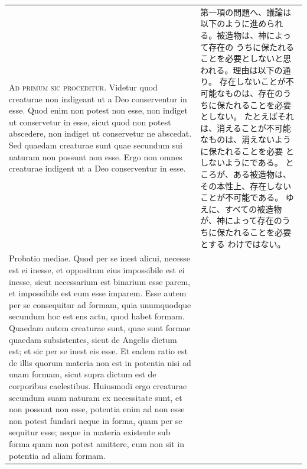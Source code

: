 \documentclass[paper=a4paper,fontsize=10pt,jafontsize=9pt,titlepage]{jlreq}
\begin{document}
\begin{longtable}{p{21em}p{21em}}


{\huge A}{\scshape d primum sic proceditur}. Videtur quod
creaturae non indigeant ut a Deo conserventur in esse. Quod enim non
potest non esse, non indiget ut conservetur in esse, sicut quod non
potest abscedere, non indiget ut conservetur ne abscedat. Sed quaedam
creaturae sunt quae secundum sui naturam non possunt non esse. Ergo non
omnes creaturae indigent ut a Deo conserventur in esse. 


&

第一項の問題へ、議論は以下のように進められる。被造物は、神によって存在の
 うちに保たれることを必要としないと思われる。理由は以下の通り。
存在しないことが不可能なものは、存在のうちに保たれることを必要としない。
 たとえばそれは、消えることが不可能なものは、消えないように保たれることを必要
 としないようにである。
ところが、ある被造物は、その本性上、存在しないことが不可能である。
ゆえに、すべての被造物が、神によって存在のうちに保たれることを必要とする
 わけではない。


\\



Probatio
mediae. Quod per se inest alicui, necesse est ei inesse, et oppositum
eius impossibile est ei inesse, sicut necessarium est binarium esse
parem, et impossibile est eum esse imparem. Esse autem per se
consequitur ad formam, quia unumquodque secundum hoc est ens actu, quod
habet formam. Quaedam autem creaturae sunt, quae sunt formae quaedam
subsistentes, sicut de Angelis dictum est; et sic per se inest eis
esse. Et eadem ratio est de illis quorum materia non est in potentia
nisi ad unam formam, sicut supra dictum est de corporibus
caelestibus. Huiusmodi ergo creaturae secundum suam naturam ex
necessitate sunt, et non possunt non esse, potentia enim ad non esse non
potest fundari neque in forma, quam per se sequitur esse; neque in
materia existente sub forma quam non potest amittere, cum non sit in
potentia ad aliam formam.


&


\end{longtable}
\end{document}
